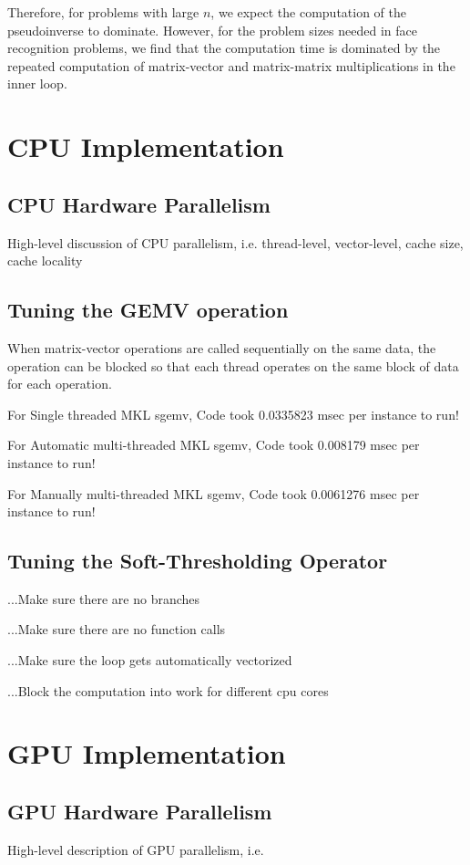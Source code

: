 \documentclass[10pt,twocolumn,letterpaper]{article}
\begin{document}
Therefore, for problems with large $n$, we expect the computation of the pseudoinverse to dominate.  However,
for the problem sizes needed in face recognition problems, we find that the computation time is dominated
by the repeated computation of matrix-vector and matrix-matrix multiplications in the inner loop.

\section{CPU Implementation}
\subsection{CPU Hardware Parallelism}
High-level discussion of CPU parallelism, i.e.
thread-level, vector-level, cache size, cache locality
\subsection{Tuning the GEMV operation}
When matrix-vector operations are called sequentially on the same data,
the operation can be blocked so that each thread operates on the same block of data for each operation.

For Single threaded MKL sgemv, Code took          0.0335823 msec per instance to run!

For Automatic multi-threaded MKL sgemv, Code took 0.008179 msec per instance to run!

For Manually multi-threaded MKL sgemv, Code took  0.0061276 msec per instance to run!

\subsection{Tuning the Soft-Thresholding Operator}
...Make sure there are no branches

...Make sure there are no function calls

...Make sure the loop gets automatically vectorized

...Block the computation into work for different cpu cores

\section{GPU Implementation}
\subsection{GPU Hardware Parallelism}
High-level description of GPU parallelism, i.e.
\end{document}
